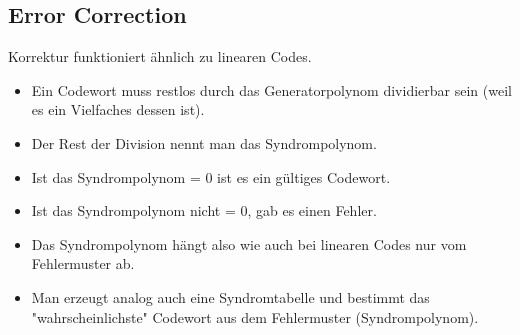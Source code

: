 \subsection{Error Correction}
Korrektur funktioniert ähnlich zu linearen Codes.
\begin{itemize}
    \item Ein Codewort muss restlos durch das Generatorpolynom dividierbar sein (weil es ein Vielfaches dessen ist).
    \item Der Rest der Division nennt man das Syndrompolynom.
    \item Ist das Syndrompolynom = 0 ist es ein gültiges Codewort.
    \item Ist das Syndrompolynom nicht = 0, gab es einen Fehler.
    \item Das Syndrompolynom hängt also wie auch bei linearen Codes nur vom Fehlermuster ab.
    \item Man erzeugt analog auch eine Syndromtabelle und bestimmt das "wahrscheinlichste" Codewort aus dem Fehlermuster (Syndrompolynom).
\end{itemize}


\clearpage
